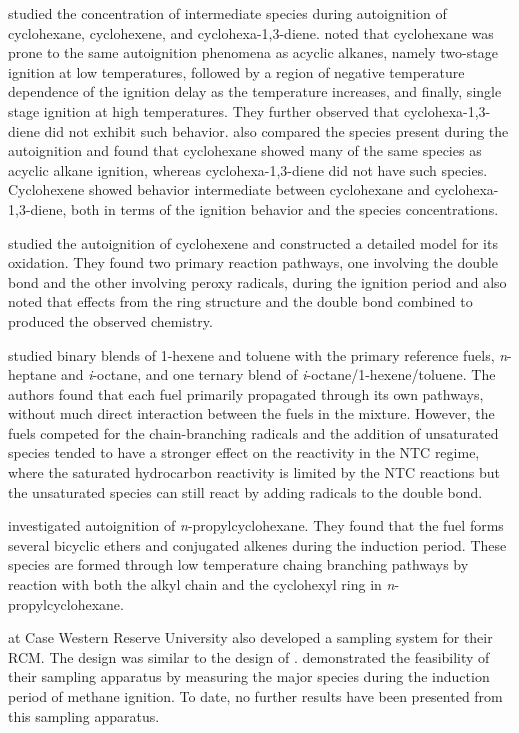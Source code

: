 \documentclass[../main.tex]{subfiles}
\begin{document}
\textcite{Lemaire2001, Ribaucour2002} studied the concentration of
intermediate species during autoignition of cyclohexane, cyclohexene,
and cyclohexa-1,3-diene. \textcite{Lemaire2001} noted that cyclohexane
was prone to the same autoignition phenomena as acyclic alkanes, namely
two-stage ignition at low temperatures, followed by a region of negative
temperature dependence of the ignition delay as the temperature increases,
and finally, single stage ignition at high temperatures. They further
observed that cyclohexa-1,3-diene did not exhibit such behavior.
\textcite{Lemaire2001} also compared the species present during the
autoignition and found that cyclohexane showed many of the same species
as acyclic alkane ignition, whereas cyclohexa-1,3-diene did not have
such species. Cyclohexene showed behavior intermediate between
cyclohexane and cyclohexa-1,3-diene, both in terms of the ignition behavior
and the species concentrations.

\textcite{Ribaucour2002} studied the autoignition of cyclohexene and
constructed a detailed model for its oxidation. They found two primary
reaction pathways, one involving the double bond and the other involving
peroxy radicals, during the ignition period and also noted that effects
from the ring structure and the double bond combined to produced the
observed chemistry.

\textcite{Vanhove2006a, Vanhove2006} studied binary blends of 1-hexene
and toluene with the primary reference fuels, \textit{n}-heptane and
\textit{i}-octane, and one ternary blend of \textit{i}-octane/1-hexene/toluene.
The authors found that each fuel primarily propagated through its own
pathways, without much direct interaction between the fuels in the mixture.
However, the fuels competed for the chain-branching radicals and the
addition of unsaturated species tended to have a stronger effect on the
reactivity in the NTC regime, where the saturated hydrocarbon reactivity
is limited by the NTC reactions but the unsaturated species can still
react by adding radicals to the double bond.

\textcite{Crochet2010} investigated autoignition of \textit{n}-propylcyclohexane.
They found that the fuel forms several bicyclic ethers and conjugated
alkenes during the induction period. These species are formed through low
temperature chaing branching pathways by reaction with both the alkyl
chain and the cyclohexyl ring in \textit{n}-propylcyclohexane.

\textcite{Mittal2006a} at Case Western Reserve University also developed
a sampling system for their RCM. The design was similar to the design of
\textcite{Roblee1961}. \textcite{Mittal2007} demonstrated the
feasibility of their sampling apparatus by measuring the major species
during the induction period of methane ignition. To date, no further
results have been presented from this sampling apparatus.
\end{document}
